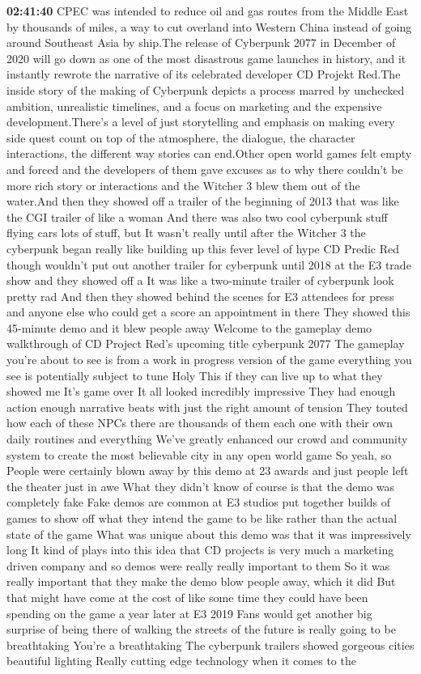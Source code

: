 \documentclass{article}%
\begin{document}
\textbf{02:41:40}%
\newline%
CPEC was intended to reduce oil and gas routes from the Middle East by thousands of miles, a way to cut overland into Western China instead of going around Southeast Asia by ship.The release of Cyberpunk 2077 in December of 2020 will go down as one of the most disastrous game launches in history, and it instantly rewrote the narrative of its celebrated developer CD Projekt Red.The inside story of the making of Cyberpunk depicts a process marred by unchecked ambition, unrealistic timelines, and a focus on marketing and the expensive development.There's a level of just storytelling and emphasis on making every side quest count on top of the atmosphere, the dialogue, the character interactions, the different way stories can end.Other open world games felt empty and forced and the developers of them gave excuses as to why there couldn't be more rich story or interactions and the Witcher 3 blew them out of the water.And then they showed off a trailer of the beginning of 2013 that was like the CGI trailer of like a woman And there was also two cool cyberpunk stuff flying cars lots of stuff, but It wasn't really until after the Witcher 3 the cyberpunk began really like building up this fever level of hype CD Predic Red though wouldn't put out another trailer for cyberpunk until 2018 at the E3 trade show and they showed off a It was like a two{-}minute trailer of cyberpunk look pretty rad And then they showed behind the scenes for E3 attendees for press and anyone else who could get a score an appointment in there They showed this 45{-}minute demo and it blew people away Welcome to the gameplay demo walkthrough of CD Project Red's upcoming title cyberpunk 2077 The gameplay you're about to see is from a work in progress version of the game everything you see is potentially subject to tune Holy This if they can live up to what they showed me It's game over It all looked incredibly impressive They had enough action enough narrative beats with just the right amount of tension They touted how each of these NPCs there are thousands of them each one with their own daily routines and everything We've greatly enhanced our crowd and community system to create the most believable city in any open world game So yeah, so People were certainly blown away by this demo at 23 awards and just people left the theater just in awe What they didn't know of course is that the demo was completely fake Fake demos are common at E3 studios put together builds of games to show off what they intend the game to be like rather than the actual state of the game What was unique about this demo was that it was impressively long It kind of plays into this idea that CD projects is very much a marketing driven company and so demos were really really important to them So it was really important that they make the demo blow people away, which it did But that might have come at the cost of like some time they could have been spending on the game a year later at E3 2019 Fans would get another big surprise of being there of walking the streets of the future is really going to be breathtaking You're a breathtaking The cyberpunk trailers showed gorgeous cities beautiful lighting Really cutting edge technology when it comes to the 
\end{document}
